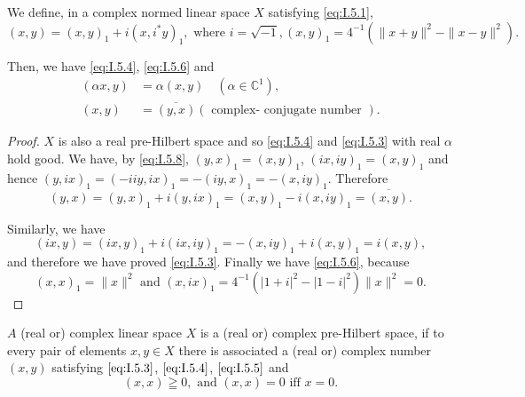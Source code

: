 \begin{corollaryn} We define, in a complex normed linear space $X$ satisfying \eqref{eq:I.5.1},
\begin{equation}(x, y) = (x, y)_{1} + i (x, i ^{*} y)_{1}, \text{ where } i = \sqrt {- 1}, (x, y)_{1} = 4 ^{-1} (\| x + y \| ^{2}- \| x- y \| ^{2}). \label{eq:I.5.8}\end{equation}

Then, we have \eqref{eq:I.5.4}, \eqref{eq:I.5.6} and 
\begin{align}
(\alpha x, y)& = \alpha (x, y) \quad (\alpha \in \mathbb{C}^{1}), \tag{3'}\label{eq:I.5.3'} \\
(x, y)& = \overline {{(y , x)}} (\text{ complex- conjugate number }). \tag{5'}\label{eq:I.5.5'}
\end{align}

\end{corollaryn}
\begin{proof}
 $X$ is also a real pre-Hilbert space and so \eqref{eq:I.5.4} and \eqref{eq:I.5.3} with real $\alpha$ hold good. We have, by \eqref{eq:I.5.8}, $(y, x)_1 = (x, y)_1$, $(ix, iy)_1 = (x, y)_1$ and hence $(y, ix)_1 = (-iiy, ix)_1 =-(iy, x)_1 =-(x, iy)_1$. Therefore 
\[
(y, x) = (y, x)_{1} + i (y, i x)_{1} = (x, y)_{1}- i (x, i y)_{1} = \overline {{(x , y)}}. \]

Similarly, we have 
\[
(i x, y) = (i x, y)_{1} + i (i x, i y)_{1} =- (x, i y)_{1} + i (x, y)_{1} = i (x, y),
\]
and therefore we have proved \eqref{eq:I.5.3}. Finally we have \eqref{eq:I.5.6}, because 
\[
(x, x)_{1} = \| x \| ^{2} \text{ and } (x, i x)_{1} = 4 ^{-1} (| 1 + i | ^{2}- | 1- i | ^{2}) \| x \| ^{2} = 0.
\]
\end{proof}

\begin{theorem}\label{thm:I.5.Theorem.2} $A$ (real or) complex linear space $X$ is a (real or) complex pre-Hilbert space, if to every pair of elements $x, y \in X$ there is associated a (real or) complex number $(x, y)$ satisfying $\eqref{eq:I.5.3}$, $\eqref{eq:I.5.4}$, $\eqref{eq:I.5.5}$ and 
\begin{equation}\label{eq:I.5.9}
(x, x) \geqq 0, \text{ and } (x, x) = 0 \text{ iff } x = 0.
\end{equation}
\end{theorem}

